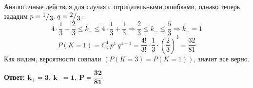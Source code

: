 \documentclass[a4paper, 12pt]{article}
\newcommand{\frc}[2]{\raisebox{2pt}{$#1$}\big/\raisebox{-3pt}{$#2$}}
\begin{document}
    Аналогичные действия для случая с отрицательными ошибками, однако теперь зададим $p=\frc{1}{3},\,q=\frc{2}{3}$:
    $$
    4\cdot\dfrac{1}{3}-\dfrac{2}{3}\leq k_{-}\leq 4\cdot\dfrac{1}{3}+\dfrac{1}{3}\Rightarrow\dfrac{2}{3}\leq k_{-} \leq \dfrac{5}{3}\Rightarrow k_{-}=1
    $$
    $$
    P\left(K=1\right)=C_{4}^{1}\,p^{1}\,q^{4-1}=\dfrac{4!}{3!}\cdot\dfrac{1}{3}\cdot\left(\dfrac{2}{3}\right)^3=\dfrac{32}{81}
    $$
    Как видим, вероятности совпали $(P(K=3)=P(K=1))$, значит все верно.


    \textbf{Ответ: $\mathbf{k_{+}=3,\ k_{-}=1,\ P=\dfrac{32}{81}}$}
\end{document}
